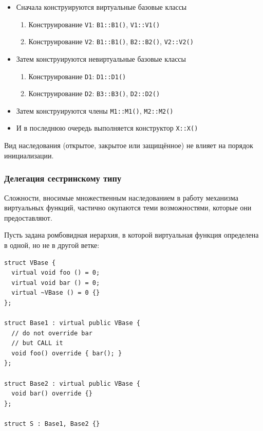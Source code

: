 \documentclass[a4paper,12pt,oneside]{article}
\begin{document}
\begin{itemize}
\item Сначала конструируются виртуальные базовые классы
  \begin{enumerate}
  \item Конструирование \lstinline!V1!: \lstinline!B1::B1()!, \lstinline!V1::V1()!
  \item Конструирование \lstinline!V2!: \lstinline!B1::B1()!, \lstinline!B2::B2()!, \lstinline!V2::V2()!
  \end{enumerate}
\item Затем конструируются невиртуальные базовые классы
  \begin{enumerate}
  \item Конструирование \lstinline!D1!: \lstinline!D1::D1()!
  \item Конструирование \lstinline!D2!: \lstinline!B3::B3()!, \lstinline!D2::D2()!
  \end{enumerate}
\item Затем конструируются члены \lstinline!M1::M1()!, \lstinline!M2::M2()!
\item И в последнюю очередь выполняется конструктор \lstinline!X::X()!
\end{itemize}

Вид наследования (открытое, закрытое или защищённое) не влияет на порядок инициализации.

\subsubsection{Делегация сестринскому типу}

Сложности, вносимые множественным наследованием в работу механизма виртуальных функций, частично окупаются теми возможностями, которые они предоставляют.

Пусть задана ромбовидная иерархия, в которой виртуальная функция определена в одной, но не в другой ветке:

\begin{lstlisting}
struct VBase {
  virtual void foo () = 0;
  virtual void bar () = 0;
  virtual ~VBase () = 0 {}
};

struct Base1 : virtual public VBase {
  // do not override bar
  // but CALL it
  void foo() override { bar(); }  
};

struct Base2 : virtual public VBase {
  void bar() override {}
};

struct S : Base1, Base2 {}
\end{lstlisting}
\end{document}

